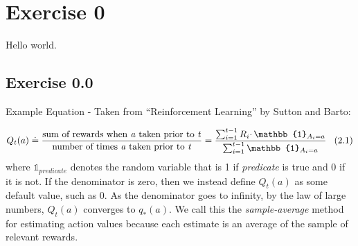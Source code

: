 \documentclass{article}
\begin{document}
\maketitle

\section{Exercise 0}
Hello world.

\subsection{Exercise 0.0}
Example Equation - Taken from ``Reinforcement Learning'' by Sutton and Barto:

$$ Q_t(a) \doteq \frac{\text{sum of rewards when \emph{a} taken prior to \emph{t}}}{\text{number of times \emph{a} taken prior to \emph{t}}} = \frac{\sum_{i=1}^{t-1} R_i \cdotp \mathbb{1}_{A_i=a}}{\sum_{i=1}^{t-1}\mathbb{1}_{A_i=a}} \thickspace \thickspace \thickspace \text{(2.1)} $$
where $ \mathbb{1}_{predicate} $ denotes the random variable that is 1 if \emph{predicate} is true and 0 if it is not.
If the denominator is zero, then we instead define $ Q_t(a) $ as some default value, such as
0. As the denominator goes to infinity, by the law of large numbers, $ Q_t(a) $ converges to
$ q_*(a) $. We call this the \emph{sample-average} method for estimating action values because each
estimate is an average of the sample of relevant rewards.

\end{document}
